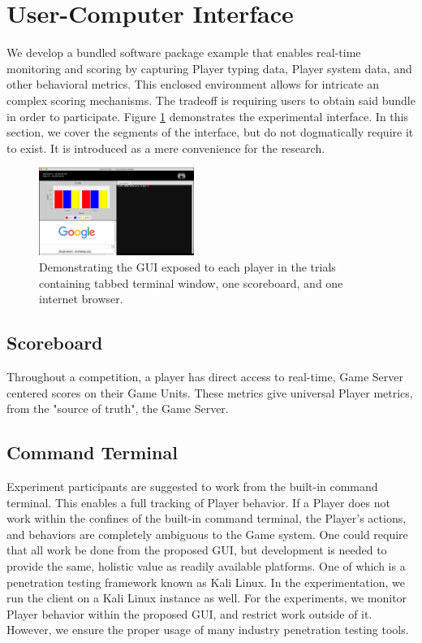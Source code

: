 \documentclass[10pt, titlepage, twocolumn]{article}
\newcommand{\ii}{\indent\indent}
\begin{document}
\section{User-Computer Interface}
We develop a bundled software package example that enables real-time monitoring and scoring by capturing Player typing data, Player system data, and other behavioral metrics. This enclosed environment allows for intricate an complex scoring mechanisms. The tradeoff is requiring users to obtain said bundle in order to participate. Figure \ref{utcinterface} demonstrates the experimental interface. In this section, we cover the segments of the interface, but do not dogmatically require it to exist. It is introduced as a mere convenience for the research.


\begin{figure}[ht]
\centering
	\includegraphics[width=0.45\textwidth]{utcinterface}
	\caption{Demonstrating the GUI exposed to each player in the trials containing tabbed terminal window, one scoreboard, and one internet browser.}
	\label{utcinterface}
\end{figure}



\subsection{Scoreboard}
\ii
Throughout a competition, a player has direct access to real-time, Game Server centered scores on their Game Units. These metrics give universal Player metrics, from the "source of truth", the Game Server.

\subsection{Command Terminal}
\ii
Experiment participants are suggested to work from the built-in command terminal. This enables a full tracking of Player behavior. If a Player does not work within the confines of the built-in command terminal, the Player's actions, and behaviors are completely ambiguous to the Game system. One could require that all work be done from the proposed GUI, but development is needed to provide the same, holistic value as readily available platforms. One of which is a penetration testing framework known as Kali Linux. In the experimentation, we run the client on a Kali Linux instance as well. For the experiments, we monitor Player behavior within the proposed GUI, and restrict work outside of it. However, we ensure the proper usage of many industry penetration testing tools.
\end{document}
